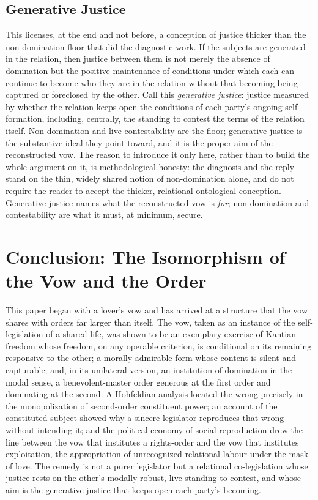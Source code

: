 \subsection{Generative Justice}

This licenses, at the end and not before, a conception of justice thicker than the non-domination floor that did the diagnostic work. If the subjects are generated in the relation, then justice between them is not merely the absence of domination but the positive maintenance of conditions under which each can continue to become who they are in the relation without that becoming being captured or foreclosed by the other. Call this \emph{generative justice}: justice measured by whether the relation keeps open the conditions of each party's ongoing self-formation, including, centrally, the standing to contest the terms of the relation itself. Non-domination and live contestability are the floor; generative justice is the substantive ideal they point toward, and it is the proper aim of the reconstructed vow. The reason to introduce it only here, rather than to build the whole argument on it, is methodological honesty: the diagnosis and the reply stand on the thin, widely shared notion of non-domination alone, and do not require the reader to accept the thicker, relational-ontological conception. Generative justice names what the reconstructed vow is \emph{for}; non-domination and contestability are what it must, at minimum, secure.

\section{Conclusion: The Isomorphism of the Vow and the Order}\label{p03:sec:conclusion}

This paper began with a lover's vow and has arrived at a structure that the vow shares with orders far larger than itself. The vow, taken as an instance of the self-legislation of a shared life, was shown to be an exemplary exercise of Kantian freedom whose freedom, on any operable criterion, is conditional on its remaining responsive to the other; a morally admirable form whose content is silent and capturable; and, in its unilateral version, an institution of domination in the modal sense, a benevolent-master order generous at the first order and dominating at the second. A Hohfeldian analysis located the wrong precisely in the monopolization of second-order constituent power; an account of the constituted subject showed why a sincere legislator reproduces that wrong without intending it; and the political economy of social reproduction drew the line between the vow that institutes a rights-order and the vow that institutes exploitation, the appropriation of unrecognized relational labour under the mask of love. The remedy is not a purer legislator but a relational co-legislation whose justice rests on the other's modally robust, live standing to contest, and whose aim is the generative justice that keeps open each party's becoming.

